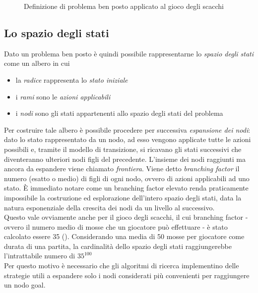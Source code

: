 \begin{figure}[t]
\centering
{}


\caption{Definizione di problema ben posto applicato al gioco degli scacchi}
\label{fig:scacchi-ben-posti}
\end{figure}


\subsection{Lo spazio degli stati}

Dato un problema ben posto è quindi possibile rappresentarne lo \emph{spazio degli stati} come un albero in cui
\begin{itemize}
   \item la \emph{radice} rappresenta lo \emph{stato iniziale}
   \item i \emph{rami} sono le \emph{azioni applicabili}
   \item i \emph{nodi} sono gli stati appartenenti allo spazio degli stati del problema
\end{itemize} 
Per costruire tale albero è possibile procedere per successiva \emph{espansione dei nodi}: dato lo stato rappresentato da un nodo, ad esso vengono applicate tutte le azioni possibili e, tramite il modello di transizione, si ricavano gli stati successivi che diventeranno ulteriori nodi figli del precedente.
L'insieme dei nodi raggiunti ma ancora da espandere viene chiamato \emph{frontiera}.
Viene detto \emph{branching factor} il numero (esatto o medio) di figli di ogni nodo, ovvero di azioni applicabili ad uno stato.
È immediato notare come un branching factor elevato renda praticamente impossibile la costruzione ed esplorazione dell'intero spazio degli stati, data la natura esponenziale della crescita dei nodi da un livello al successivo.\\
Questo vale ovviamente anche per il gioco degli scacchi, il cui branching factor - ovvero il numero medio di mosse che un giocatore può effettuare - è stato calcolato essere 35 (\cite{chessbf}).
Considerando una media di 50 mosse per giocatore come durata di una partita, la cardinalità dello spazio degli stati raggiungerebbe l'intrattabile numero di $ 35^{100} $ \\
Per questo motivo è necessario che gli algoritmi di ricerca implementino delle strategie utili a espandere solo i nodi considerati più convenienti per raggiungere un nodo goal.

